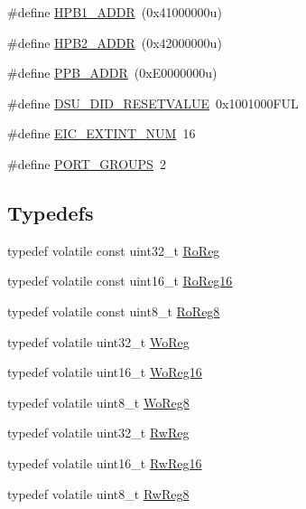 \begin{DoxyCompactItemize}
\#define \mbox{\hyperlink{group___s_a_m_d21_g18_a_u__definitions_gabdae009c8fef488e4248183ffa937535}{H\+P\+B1\+\_\+\+A\+D\+DR}}~(0x41000000u)
\item 
\#define \mbox{\hyperlink{group___s_a_m_d21_g18_a_u__definitions_gaef42fa53ddf169a2a50be70d29f73571}{H\+P\+B2\+\_\+\+A\+D\+DR}}~(0x42000000u)
\item 
\#define \mbox{\hyperlink{group___s_a_m_d21_g18_a_u__definitions_ga8895d0a3a9a3126cc44330f86c8ce564}{P\+P\+B\+\_\+\+A\+D\+DR}}~(0x\+E0000000u)
\item 
\#define \mbox{\hyperlink{group___s_a_m_d21_g18_a_u__definitions_gada75131d542c9e1966238f5488f89bd6}{D\+S\+U\+\_\+\+D\+I\+D\+\_\+\+R\+E\+S\+E\+T\+V\+A\+L\+UE}}~0x1001000\+F\+UL
\item 
\#define \mbox{\hyperlink{group___s_a_m_d21_g18_a_u__definitions_ga88ebc38c95506296f5d21f82476296ae}{E\+I\+C\+\_\+\+E\+X\+T\+I\+N\+T\+\_\+\+N\+UM}}~16
\item 
\#define \mbox{\hyperlink{group___s_a_m_d21_g18_a_u__definitions_gab9243ffe03a1dc631b57a495b4b3d467}{P\+O\+R\+T\+\_\+\+G\+R\+O\+U\+PS}}~2
\end{DoxyCompactItemize}
\subsection*{Typedefs}
\begin{DoxyCompactItemize}
\item 
typedef volatile const uint32\+\_\+t \mbox{\hyperlink{group___s_a_m_d21_g18_a_u__definitions_ga5d556f8391af4141be23f7334ac9dd68}{Ro\+Reg}}
\item 
typedef volatile const uint16\+\_\+t \mbox{\hyperlink{group___s_a_m_d21_g18_a_u__definitions_gaebf6e33c2d49a802e06e22a95ea9d0d0}{Ro\+Reg16}}
\item 
typedef volatile const uint8\+\_\+t \mbox{\hyperlink{group___s_a_m_d21_g18_a_u__definitions_ga0d957f1433aaf5d70e4dc2b68288442d}{Ro\+Reg8}}
\item 
typedef volatile uint32\+\_\+t \mbox{\hyperlink{group___s_a_m_d21_g18_a_u__definitions_gac0f96d4e8018367b38f527007cf0eafd}{Wo\+Reg}}
\item 
typedef volatile uint16\+\_\+t \mbox{\hyperlink{group___s_a_m_d21_g18_a_u__definitions_ga0ab0e5f6c8301aa1c2068e511d854094}{Wo\+Reg16}}
\item 
typedef volatile uint8\+\_\+t \mbox{\hyperlink{group___s_a_m_d21_g18_a_u__definitions_ga5e336e5a36ee12ebeafb021108e5275b}{Wo\+Reg8}}
\item 
typedef volatile uint32\+\_\+t \mbox{\hyperlink{group___s_a_m_d21_g18_a_u__definitions_gacf1496e3bbe303e55f627fc7558a68c7}{Rw\+Reg}}
\item 
typedef volatile uint16\+\_\+t \mbox{\hyperlink{group___s_a_m_d21_g18_a_u__definitions_gacce07556c80fc352ae607f225f19fed5}{Rw\+Reg16}}
\item 
typedef volatile uint8\+\_\+t \mbox{\hyperlink{group___s_a_m_d21_g18_a_u__definitions_gae361754be775bb192f85821d3ab33c17}{Rw\+Reg8}}
\end{DoxyCompactItemize}


